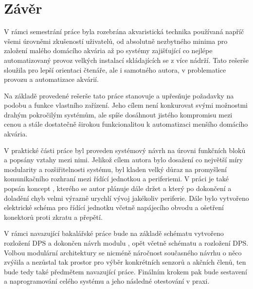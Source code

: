 \chapter*{Závěr}
{}

V rámci semestrání práce byla rozebrána akvaristická technika používaná napříč všemi úrovněmi zkušeností uživatelů, od absolutně nezbytného minima pro založení malého domácího akvária až po systémy zajišťující co nejlépe automatizovaný provoz velkých instalací skládajících se z více nádrží. Tato rešerše sloužila pro lepší orientaci čtenáře, ale i samotného autora, v problematice provozu a automatizace akvárií. 

Na základě provedené rešerše tato práce stanovuje a upřesňuje požadavky na podobu a funkce vlastního zařízení. Jeho cílem není konkurovat svými možnostmi drahým pokročilým systémům, ale spíše dosáhnout jistého kompromisu mezi cenou a stále dostatečně širokou funkcionalitou k automatizaci menšího domácího akvária.

V praktické části práce byl proveden systémový návrh na úrovni funkčních bloků a popsány vztahy mezi nimi. Jelikož cílem autora bylo dosažení co největší míry modularity a rozšiřitelnosti systému, byl kladen velký důraz na promyšlení komunikačního rozhraní mezi řídící jednotkou a periferiemi. V práci je také popsán koncept , kterého se autor plánuje dále držet a který po dokončení a doladění chyb velmi výrazně urychlí vývoj jakékoliv periferie. Dále bylo vytvořeno elektrické schéma pro řídící jednotku včetně napájecího obvodu a ošetření konektorů proti zkratu a přepětí. 

V rámci navazující bakalářské práce bude na základě schématu vytvořeno rozložení DPS a dokončen návrh modulu , opět včetně schématu a rozložení DPS. Volbou modulární architektury se nicméně náročnost současného návrhu o něco zvýšila a nezůstal tak prostor pro výběr konkrétních senzorů a akčních členů, ten bude tedy také předmětem navazující práce. Finálním krokem pak bude sestavení a naprogramování celého systému a jeho následné otestování v praxi.
